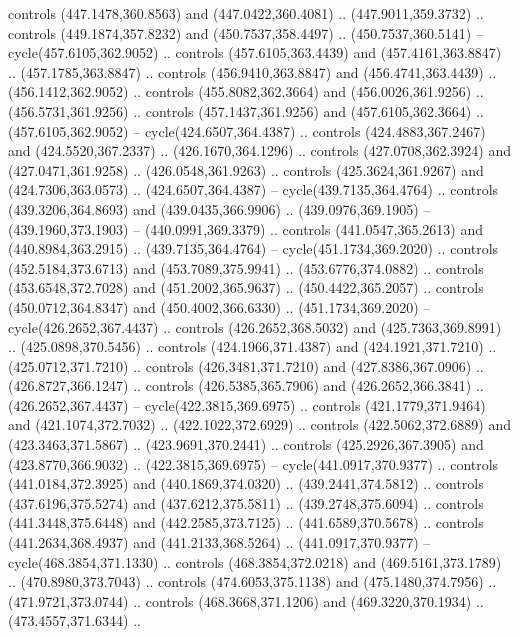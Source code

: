 \begin{scope}[cm={{1.25,0.0,0.0,-1.25,(0.0,743.43331)}}]
    controls (447.1478,360.8563) and (447.0422,360.4081) .. (447.9011,359.3732) ..
    controls (449.1874,357.8232) and (450.7537,358.4497) .. (450.7537,360.5141) --
    cycle(457.6105,362.9052) .. controls (457.6105,363.4439) and
    (457.4161,363.8847) .. (457.1785,363.8847) .. controls (456.9410,363.8847) and
    (456.4741,363.4439) .. (456.1412,362.9052) .. controls (455.8082,362.3664) and
    (456.0026,361.9256) .. (456.5731,361.9256) .. controls (457.1437,361.9256) and
    (457.6105,362.3664) .. (457.6105,362.9052) -- cycle(424.6507,364.4387) ..
    controls (424.4883,367.2467) and (424.5520,367.2337) .. (426.1670,364.1296) ..
    controls (427.0708,362.3924) and (427.0471,361.9258) .. (426.0548,361.9263) ..
    controls (425.3624,361.9267) and (424.7306,363.0573) .. (424.6507,364.4387) --
    cycle(439.7135,364.4764) .. controls (439.3206,364.8693) and
    (439.0435,366.9906) .. (439.0976,369.1905) -- (439.1960,373.1903) --
    (440.0991,369.3379) .. controls (441.0547,365.2613) and (440.8984,363.2915) ..
    (439.7135,364.4764) -- cycle(451.1734,369.2020) .. controls
    (452.5184,373.6713) and (453.7089,375.9941) .. (453.6776,374.0882) .. controls
    (453.6548,372.7028) and (451.2002,365.9637) .. (450.4422,365.2057) .. controls
    (450.0712,364.8347) and (450.4002,366.6330) .. (451.1734,369.2020) --
    cycle(426.2652,367.4437) .. controls (426.2652,368.5032) and
    (425.7363,369.8991) .. (425.0898,370.5456) .. controls (424.1966,371.4387) and
    (424.1921,371.7210) .. (425.0712,371.7210) .. controls (426.3481,371.7210) and
    (427.8386,367.0906) .. (426.8727,366.1247) .. controls (426.5385,365.7906) and
    (426.2652,366.3841) .. (426.2652,367.4437) -- cycle(422.3815,369.6975) ..
    controls (421.1779,371.9464) and (421.1074,372.7032) .. (422.1022,372.6929) ..
    controls (422.5062,372.6889) and (423.3463,371.5867) .. (423.9691,370.2441) ..
    controls (425.2926,367.3905) and (423.8770,366.9032) .. (422.3815,369.6975) --
    cycle(441.0917,370.9377) .. controls (441.0184,372.3925) and
    (440.1869,374.0320) .. (439.2441,374.5812) .. controls (437.6196,375.5274) and
    (437.6212,375.5811) .. (439.2748,375.6094) .. controls (441.3448,375.6448) and
    (442.2585,373.7125) .. (441.6589,370.5678) .. controls (441.2634,368.4937) and
    (441.2133,368.5264) .. (441.0917,370.9377) -- cycle(468.3854,371.1330) ..
    controls (468.3854,372.0218) and (469.5161,373.1789) .. (470.8980,373.7043) ..
    controls (474.6053,375.1138) and (475.1480,374.7956) .. (471.9721,373.0744) ..
    controls (468.3668,371.1206) and (469.3220,370.1934) .. (473.4557,371.6344) ..

\end{scope}
